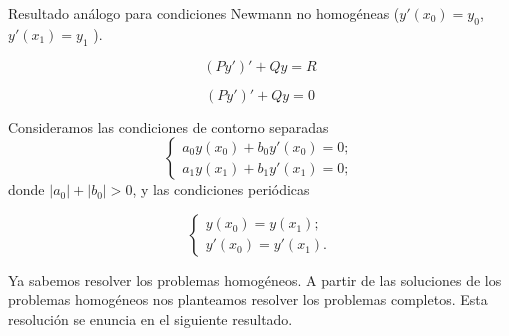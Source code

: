 \documentclass{article}
\begin{document}
\begin{ex}
  
\end{ex}

\begin{ex}
  Resultado análogo para condiciones Newmann no homogéneas ($y'(x_0) = y_0$, $y'(x_1) = y_1$ ).
\end{ex}

\begin{ex}
  
\end{ex}

\begin{equation}
  \label{eq:sturm:ec}
  (Py')' + Qy = R
\end{equation}

\begin{equation}
  \label{eq:sturm:eh}
  (Py')' + Qy = 0
\end{equation}

Consideramos las condiciones de contorno separadas
\begin{equation}
  \label{eq:sturm:sep}
  \begin{cases}
    a_0 y(x_0) + b_0 y'(x_0) = 0; \\ a_1 y(x_1) + b_1 y'(x_1) = 0;
  \end{cases}
\end{equation}
donde $|a_0| + |b_0| > 0$, y las condiciones periódicas

\begin{equation}
  \label{eq:sturm:ped}
  \begin{cases}
    y(x_0) = y(x_1); \\ y'(x_0) = y'(x_1).
  \end{cases}
\end{equation}

Ya sabemos resolver los problemas homogéneos. A partir de las soluciones de los problemas homogéneos
nos planteamos resolver los problemas completos. Esta resolución se enuncia en el siguiente
resultado.
\end{document}
